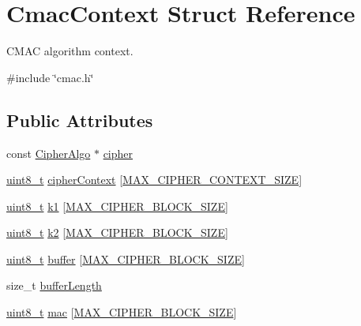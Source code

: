 \hypertarget{structCmacContext}{}\section{Cmac\+Context Struct Reference}
\label{structCmacContext}


C\+M\+AC algorithm context.  




{\ttfamily \#include \char`\"{}cmac.\+h\char`\"{}}

\subsection*{Public Attributes}
\begin{DoxyCompactItemize}
\item 
const \hyperlink{structCipherAlgo}{Cipher\+Algo} $\ast$ \hyperlink{structCmacContext_aaec26a5f11f59e011e72b94c18ca8b81}{cipher}
\item 
\hyperlink{stdint_8h_aba7bc1797add20fe3efdf37ced1182c5}{uint8\+\_\+t} \hyperlink{structCmacContext_a30e362e52be60ba1407fffeb5d6957ec}{cipher\+Context} \mbox{[}\hyperlink{cyclone__crypto_2core_2crypto_8h_a99fb8f5b5cc906fd435df00c1720f7ad}{M\+A\+X\+\_\+\+C\+I\+P\+H\+E\+R\+\_\+\+C\+O\+N\+T\+E\+X\+T\+\_\+\+S\+I\+ZE}\mbox{]}
\item 
\hyperlink{stdint_8h_aba7bc1797add20fe3efdf37ced1182c5}{uint8\+\_\+t} \hyperlink{structCmacContext_a5a42e4c3d8057ef628192ac02df4f14e}{k1} \mbox{[}\hyperlink{cyclone__crypto_2core_2crypto_8h_ad7d23a73335aef1d701df177a8f92b80}{M\+A\+X\+\_\+\+C\+I\+P\+H\+E\+R\+\_\+\+B\+L\+O\+C\+K\+\_\+\+S\+I\+ZE}\mbox{]}
\item 
\hyperlink{stdint_8h_aba7bc1797add20fe3efdf37ced1182c5}{uint8\+\_\+t} \hyperlink{structCmacContext_a2ba78c0c3c708c399afba99350f07aea}{k2} \mbox{[}\hyperlink{cyclone__crypto_2core_2crypto_8h_ad7d23a73335aef1d701df177a8f92b80}{M\+A\+X\+\_\+\+C\+I\+P\+H\+E\+R\+\_\+\+B\+L\+O\+C\+K\+\_\+\+S\+I\+ZE}\mbox{]}
\item 
\hyperlink{stdint_8h_aba7bc1797add20fe3efdf37ced1182c5}{uint8\+\_\+t} \hyperlink{structCmacContext_ab4ba44f829299a64e9cccfc88ee1ee78}{buffer} \mbox{[}\hyperlink{cyclone__crypto_2core_2crypto_8h_ad7d23a73335aef1d701df177a8f92b80}{M\+A\+X\+\_\+\+C\+I\+P\+H\+E\+R\+\_\+\+B\+L\+O\+C\+K\+\_\+\+S\+I\+ZE}\mbox{]}
\item 
size\+\_\+t \hyperlink{structCmacContext_a0606cddcb5373f144b550578a441af42}{buffer\+Length}
\item 
\hyperlink{stdint_8h_aba7bc1797add20fe3efdf37ced1182c5}{uint8\+\_\+t} \hyperlink{structCmacContext_a333c4734c4c2f959167d24c5d7f17f73}{mac} \mbox{[}\hyperlink{cyclone__crypto_2core_2crypto_8h_ad7d23a73335aef1d701df177a8f92b80}{M\+A\+X\+\_\+\+C\+I\+P\+H\+E\+R\+\_\+\+B\+L\+O\+C\+K\+\_\+\+S\+I\+ZE}\mbox{]}
\end{DoxyCompactItemize}


